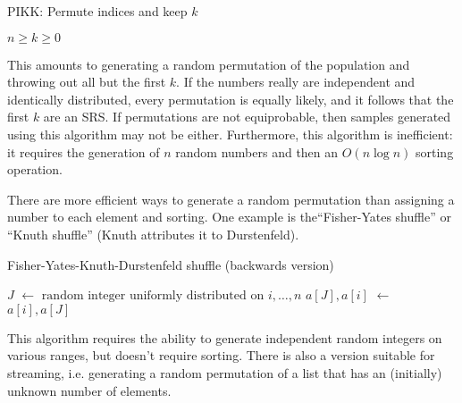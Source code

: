 \documentclass[graybox]{svmult}
\newcommand*\Let[2]{\State #1 $\gets$ #2}
\begin{document}
\begin{algorithm}                      %
\caption{PIKK: Permute indices and keep $k$}          %
\label{PIKK}                           %
\begin{algorithmic}[1]               %
    \Require $n \geq k \geq 0$
    \Statex
\end{algorithmic}
\end{algorithm}

This amounts to generating a random permutation of the population and throwing out all but the first $k$.
If the numbers really are independent and identically distributed, every permutation is equally likely, and it follows that the first $k$ are an SRS.
If permutations are not equiprobable, then samples generated using this algorithm may not be either.
Furthermore, this algorithm is inefficient: it requires the generation of $n$ random numbers and then an $O(n\log n)$ sorting operation.

There are more efficient ways to generate a random permutation than assigning a number to each element and sorting.
One example is the``Fisher-Yates shuffle'' or ``Knuth shuffle'' (Knuth attributes it to Durstenfeld).

\begin{algorithm}                      %
\caption{Fisher-Yates-Knuth-Durstenfeld shuffle (backwards version)}          %
\label{FYKD}                           %
\begin{algorithmic}[1]               %
    \Let{$J$}{$\text{random integer uniformly distributed on }i, \dots, n$}
    \Let{$a[J], a[i]$}{$a[i], a[J]$}
\EndFor
\end{algorithmic}
\end{algorithm}

This algorithm requires the ability to generate independent random integers on various ranges, but doesn't require sorting.
There is also a version suitable for streaming, i.e. generating a random permutation of a list that has an (initially) unknown number of elements.
\end{document}
